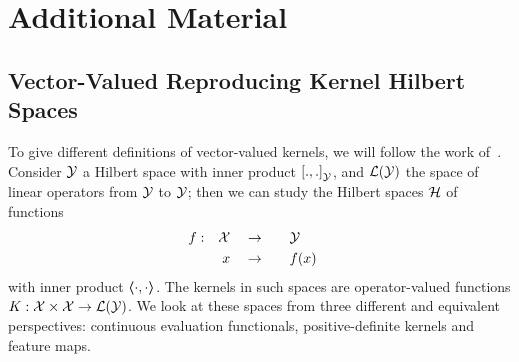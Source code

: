 
\chapter{Additional Material}
\label{AppendixB}



\section{Vector-Valued Reproducing Kernel Hilbert Spaces}%
To give different definitions of vector-valued kernels, we will follow the work of~\citet{MicchelliP05}.
Consider $\mathcal{Y}$ a Hilbert space with inner product $\left[ ., . \right]_\mathcal{Y}$, and $\mathcal{L}(\mathcal{Y})$ the space of linear operators from $\mathcal{Y}$ to $\mathcal{Y}$; then we can study the Hilbert spaces $\mathcal{H}$ of functions
\begin{equation*}
    \begin{aligned}
        f: &  & \mathcal{X} &  &  & \to &  &  &  & \mathcal{Y} &  & \\
           &  & x       &  &  & \to &  &  &  & f(x)    &  &
    \end{aligned}
\end{equation*}
with inner product $\bm{\left\langle} \cdot, \cdot \bm{\right\rangle}$.
The kernels in such spaces are operator-valued functions $K: \mathcal{X} \times \mathcal{X} \to \mathcal{L}(\mathcal{Y})$.
We look at these spaces from three different and equivalent perspectives: continuous evaluation functionals, positive-definite kernels and feature maps.

